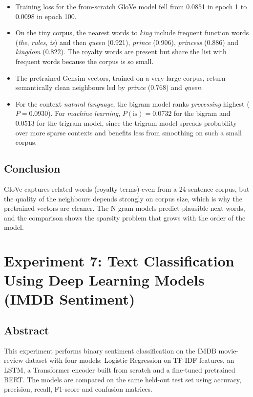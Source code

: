 \documentclass[12pt,a4paper,oneside]{report}
\providecommand{\tightlist}{\setlength{\itemsep}{0pt}\setlength{\parskip}{0pt}}
\begin{document}
\begin{itemize}
\tightlist
\item
  Training loss for the from-scratch GloVe model fell from 0.0851 in epoch 1 to 0.0098 in epoch 100.
\item
  On the tiny corpus, the nearest words to \emph{king} include frequent function words (\emph{the}, \emph{rules}, \emph{is}) and then \emph{queen} (0.921), \emph{prince} (0.906), \emph{princess} (0.886) and \emph{kingdom} (0.822). The royalty words are present but share the list with frequent words because the corpus is so small.
\item
  The pretrained Gensim vectors, trained on a very large corpus, return semantically clean neighbours led by \emph{prince} (0.768) and \emph{queen}.
\item
  For the context \emph{natural language}, the bigram model ranks \emph{processing} highest (\(P=0.0930\)). For \emph{machine learning}, \(P(\text{is})=0.0732\) for the bigram and \(0.0513\) for the trigram model, since the trigram model spreads probability over more sparse contexts and benefits less from smoothing on such a small corpus.
\end{itemize}


\section{Conclusion}
GloVe captures related words (royalty terms) even from a 24-sentence corpus, but the quality of the neighbours depends strongly on corpus size, which is why the pretrained vectors are cleaner. The N-gram models predict plausible next words, and the comparison shows the sparsity problem that grows with the order of the model.


\chapter{Experiment 7: Text Classification Using Deep Learning Models (IMDB Sentiment)}
\section{Abstract}
This experiment performs binary sentiment classification on the IMDB movie-review dataset with four models: Logistic Regression on TF-IDF features, an LSTM, a Transformer encoder built from scratch and a fine-tuned pretrained BERT. The models are compared on the same held-out test set using accuracy, precision, recall, F1-score and confusion matrices.
\end{document}
